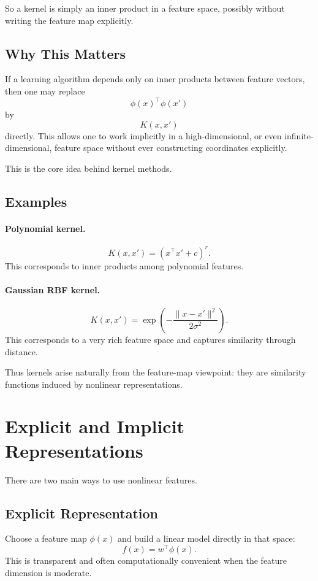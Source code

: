 So a kernel is simply an inner product in a feature space, possibly without writing the feature map explicitly.

\subsection{Why This Matters}

If a learning algorithm depends only on inner products between feature vectors, then one may replace
\[
\phi(x)^\top \phi(x')
\]
by
\[
K(x,x')
\]
directly. This allows one to work implicitly in a high-dimensional, or even infinite-dimensional, feature space without ever constructing coordinates explicitly.

This is the core idea behind kernel methods.

\subsection{Examples}

\paragraph{Polynomial kernel.}
\[
K(x,x')=(x^\top x' + c)^r.
\]
This corresponds to inner products among polynomial features.

\paragraph{Gaussian RBF kernel.}
\[
K(x,x')=\exp\!\left(-\frac{\|x-x'\|^2}{2\sigma^2}\right).
\]
This corresponds to a very rich feature space and captures similarity through distance.

Thus kernels arise naturally from the feature-map viewpoint: they are similarity functions induced by nonlinear representations.

\section{Explicit and Implicit Representations}

There are two main ways to use nonlinear features.

\subsection{Explicit Representation}

Choose a feature map $\phi(x)$ and build a linear model directly in that space:
\[
f(x)=w^\top \phi(x).
\]
This is transparent and often computationally convenient when the feature dimension is moderate.

